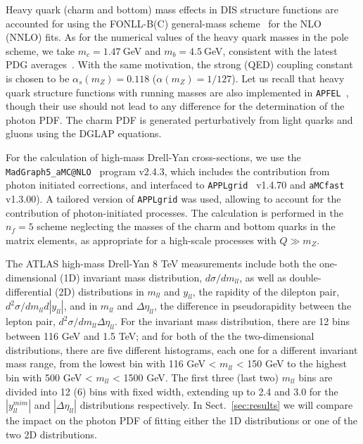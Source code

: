 Heavy quark (charm and bottom) mass effects in DIS structure functions are accounted
for using the FONLL-B(C) general-mass scheme~\cite{Forte:2010ta}
for the NLO (NNLO) fits.
%
As for the numerical values of the heavy quark masses in the pole scheme,
we take  $m_c=1.47~$GeV and $m_b=4.5~$GeV, consistent with the latest
PDG averages~\cite{Agashe:2014kda}.
%
With the same motivation, the strong (QED) coupling constant is chosen to be  $\alpha_s(m_Z)=0.118$
($\alpha(m_Z)=1/127$).
%
Let us recall that heavy quark structure functions with running masses
are also implemented in {\tt APFEL}~\cite{Bertone:2016ywq},
though their use should not lead to any difference for the determination of the photon PDF.
%
The charm PDF is generated perturbatively from light quarks and gluons using
the DGLAP equations.

For the calculation of high-mass Drell-Yan cross-sections,
we use the {\tt MadGraph5{\_}aMC@NLO}~\cite{Alwall:2014hca} program  v2.4.3,
which includes the contribution from photon initiated corrections,
and interfaced to {\tt APPLgrid}~\cite{Carli:2010rw} v1.4.70
and {\tt aMCfast}~\cite{Carli:2010rw} v1.3.00).
%
A tailored version of  {\tt APPLgrid} was used, allowing to account for
the contribution of photon-initiated processes.
%
The calculation is performed in the $n_f=5$ scheme neglecting the masses of the charm
and bottom quarks in the matrix elements, as appropriate for a high-scale processes
with $Q \gg m_Z$.

The ATLAS high-mass Drell-Yan 8 TeV measurements include both the one-dimensional (1D)
invariant mass distribution, $d\sigma/dm_{ll}$, as well as double-differential (2D)
distributions in $m_{ll}$ and $y_{ll}$, the rapidity of the dilepton pair,
$d^{2}\sigma/dm_{ll}d|y_{ll}|$, and in $m_{ll}$ and $\Delta\eta_{ll}$,
  the difference in 
  pseudorapidity between the lepton pair, $d^{2}\sigma/dm_{ll}\Delta\eta_{ll}$.
  For the invariant mass 
  distribution, there are 12 bins between 116 GeV and 1.5 TeV; and for both of the 
 the two-dimensional distributions, there are five different histograms, each one for a different invariant
 mass range, from the lowest bin
 with 116 GeV < $m_{ll}$ < 150 GeV to the highest bin with 500 GeV < $m_{ll}$ < 1500 GeV.
 The first three (last two) $m_{ll}$ bins are divided into 12 (6) bins with fixed
 width, extending up to 2.4 and 3.0 for the  $|y_{ll}^{mim}|$ and $|\Delta\eta_{ll}|$ distributions
 respectively.
 In Sect.~\ref{sec:results} we will compare the impact on the photon PDF of fitting either
 the 1D distributions or one of the two 2D distributions.

